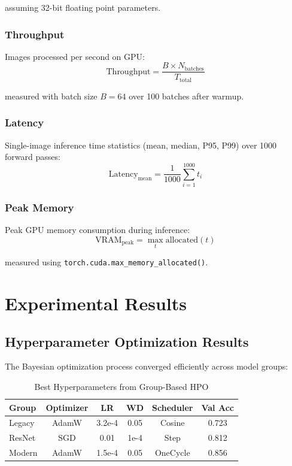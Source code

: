assuming 32-bit floating point parameters.

\subsubsection{Throughput}

Images processed per second on GPU:
\begin{equation}
\text{Throughput} = \frac{B \times N_{\text{batches}}}{T_{\text{total}}}
\end{equation}

measured with batch size $B=64$ over 100 batches after warmup.

\subsubsection{Latency}

Single-image inference time statistics (mean, median, P95, P99) over 1000 forward passes:
\begin{equation}
\text{Latency}_{\text{mean}} = \frac{1}{1000}\sum_{i=1}^{1000} t_i
\end{equation}

\subsubsection{Peak Memory}

Peak GPU memory consumption during inference:
\begin{equation}
\text{VRAM}_{\text{peak}} = \max_{t} \text{allocated}(t)
\end{equation}

measured using \texttt{torch.cuda.max\_memory\_allocated()}.

\section{Experimental Results}

\subsection{Hyperparameter Optimization Results}

The Bayesian optimization process converged efficiently across model groups:

\begin{table}[h]
\centering
\caption{Best Hyperparameters from Group-Based HPO}
\begin{tabular}{lccccc}
\hline
\textbf{Group} & \textbf{Optimizer} & \textbf{LR} & \textbf{WD} & \textbf{Scheduler} & \textbf{Val Acc} \\
\hline
Legacy & AdamW & 3.2e-4 & 0.05 & Cosine & 0.723 \\
ResNet & SGD & 0.01 & 1e-4 & Step & 0.812 \\
Modern & AdamW & 1.5e-4 & 0.05 & OneCycle & 0.856 \\
\hline
\end{tabular}
\end{table}

